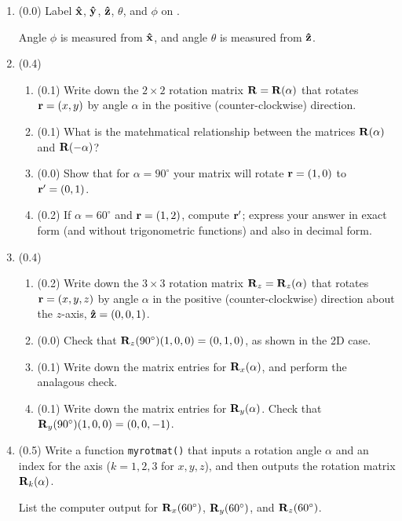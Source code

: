 \documentclass[11pt,titlepage,fleqn]{article}
\newcommand{\rotangA}{\alpha}
\begin{document}
\begin{enumerate}

\item (0.0) Label $\mbox{\boldmath{$\hat{\rm x}$}}$, $\mbox{\boldmath{$\hat{\rm y}$}}$, $\mbox{\boldmath{$\hat{\rm z}$}}$, $\theta$, and $\phi$ on .

Angle $\phi$ is measured from $\mbox{\boldmath{$\hat{\rm x}$}}$, and angle $\theta$ is measured from $\mbox{\boldmath{$\hat{\rm z}$}}$.

\item (0.4) 

\begin{enumerate}
\item (0.1) Write down the $2 \times 2$ rotation matrix $\bR = \bR(\rotangA)$ that rotates $\mbox{${\bf r}$} = (x,y)$ by angle $\rotangA$ in the positive (counter-clockwise) direction.
\item (0.1) What is the matehmatical relationship between the matrices $\bR(\rotangA)$ and $\bR(-\rotangA)$?
\item (0.0) Show that for $\rotangA = 90^\circ$ your matrix will rotate $\mbox{${\bf r}$} = (1,0)$ to $\mbox{${\bf r}$}' = (0,1)$.
\item (0.2) If $\rotangA = 60^\circ$ and $\mbox{${\bf r}$} = (1,2)$, compute $\mbox{${\bf r}$}'$; express your answer in exact form (and without trigonometric functions) and also in decimal form.
\end{enumerate}

\item (0.4)

\begin{enumerate}
\item (0.2) Write down the $3 \times 3$ rotation matrix $\bR_z = \bR_z(\rotangA)$ that rotates $\mbox{${\bf r}$} = (x,y,z)$ by angle $\rotangA$ in the positive (counter-clockwise) direction about the $z$-axis, $\mbox{\boldmath{$\hat{\rm z}$}} = (0,0,1)$.
\item (0.0) Check that $\mbox{${\bf R}$}_z(90^\circ)(1,0,0) = (0,1,0)$, as shown in the 2D case.
\item (0.1) Write down the matrix entries for $\bR_x(\rotangA)$, and perform the analagous check.
\item (0.1) Write down the matrix entries for $\bR_y(\rotangA)$. Check that $\mbox{${\bf R}$}_y(90^\circ)(1,0,0) = (0,0,-1)$.
\end{enumerate}

\item (0.5) Write a function \verb+myrotmat()+ that inputs a rotation angle $\rotangA$ and an index for the axis ($k = 1,2,3$ for $x,y,z$), and then outputs the rotation matrix $\bR_k(\rotangA)$. 

List the computer output for $\mbox{${\bf R}$}_x(60^\circ)$, $\mbox{${\bf R}$}_y(60^\circ)$, and $\mbox{${\bf R}$}_z(60^\circ)$.


\end{enumerate}
\end{document}
